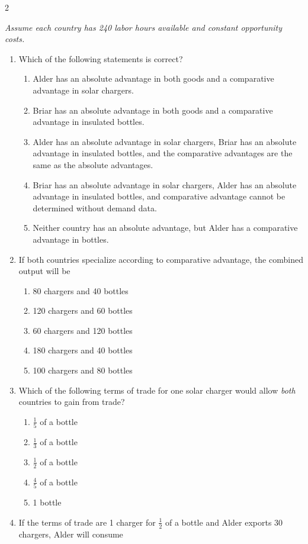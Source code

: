 \documentclass[10pt]{article}
\newenvironment{choiceslist}
  {\begin{enumerate}[label=(\Alph*), leftmargin=1.6em, itemsep=0.12em, topsep=0.18em, parsep=0pt]}
  {\end{enumerate}}
\newenvironment{stimulus}
  {\begin{center}\begin{minipage}{0.96\columnwidth}\footnotesize\itshape\setlength{\tabcolsep}{3pt}\renewcommand{\arraystretch}{0.96}}
  {\end{minipage}\end{center}}
\begin{document}
\begin{multicols*}{2}
\begin{stimulus}
Assume each country has 240 labor hours available and constant opportunity costs.
\end{stimulus}
\begin{enumerate}[series=apq, leftmargin=*, itemsep=0.85em, topsep=0.2em, parsep=0pt]
\item Which of the following statements is correct?
\begin{choiceslist}
\item Alder has an absolute advantage in both goods and a comparative advantage in solar chargers.
\item Briar has an absolute advantage in both goods and a comparative advantage in insulated bottles.
\item Alder has an absolute advantage in solar chargers, Briar has an absolute advantage in insulated bottles, and the comparative advantages are the same as the absolute advantages.
\item Briar has an absolute advantage in solar chargers, Alder has an absolute advantage in insulated bottles, and comparative advantage cannot be determined without demand data.
\item Neither country has an absolute advantage, but Alder has a comparative advantage in bottles.
\end{choiceslist}
\item If both countries specialize according to comparative advantage, the combined output will be
\begin{choiceslist}
\item 80 chargers and 40 bottles
\item 120 chargers and 60 bottles
\item 60 chargers and 120 bottles
\item 180 chargers and 40 bottles
\item 100 chargers and 80 bottles
\end{choiceslist}
\item Which of the following terms of trade for one solar charger would allow \emph{both} countries to gain from trade?
\begin{choiceslist}
\item $\tfrac{1}{5}$ of a bottle
\item $\tfrac{1}{3}$ of a bottle
\item $\tfrac{1}{2}$ of a bottle
\item $\tfrac{4}{5}$ of a bottle
\item 1 bottle
\end{choiceslist}
\item If the terms of trade are 1 charger for $\tfrac{1}{2}$ of a bottle and Alder exports 30 chargers, Alder will consume

\end{enumerate}
\end{multicols*}
\end{document}
